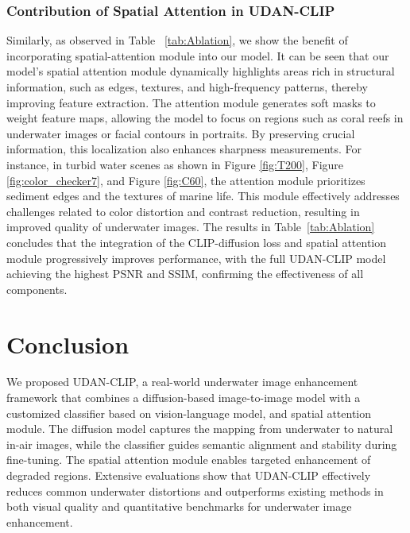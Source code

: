 \documentclass[3p,12pt,authoryear]{elsarticle}
\begin{document}
\subsubsection{Contribution of Spatial Attention in UDAN-CLIP}

Similarly, as observed in Table ~\ref{tab:Ablation}, we show the benefit of incorporating spatial-attention module into our model. It can be seen that our model's spatial attention module dynamically highlights areas rich in structural information, such as edges, textures, and high-frequency patterns, thereby improving feature extraction. The attention module generates soft masks to weight feature maps, allowing the model to focus on regions such as coral reefs in underwater images or facial contours in portraits. By preserving crucial information, this localization also enhances sharpness measurements. For instance, in turbid water scenes as shown in Figure \ref{fig:T200}, Figure \ref{fig:color_checker7}, and Figure \ref{fig:C60}, the attention module prioritizes sediment edges and the textures of marine life. This module effectively addresses challenges related to color distortion and contrast reduction, resulting in improved quality of underwater images. The results in Table~\ref{tab:Ablation} concludes that the integration of the CLIP-diffusion loss and spatial attention module progressively improves performance, with the full UDAN-CLIP model achieving the highest PSNR and SSIM, confirming the effectiveness of all components.

\section{Conclusion}

We proposed UDAN-CLIP, a real-world underwater image enhancement framework that combines a diffusion-based image-to-image model with a customized classifier based on vision-language model, and spatial attention module. The diffusion model captures the mapping from underwater to natural in-air images, while the classifier guides semantic alignment and stability during fine-tuning. The spatial attention module enables targeted enhancement of degraded regions. Extensive evaluations show that UDAN-CLIP effectively reduces common underwater distortions and outperforms existing methods in both visual quality and quantitative benchmarks for underwater image enhancement.





\end{document}
